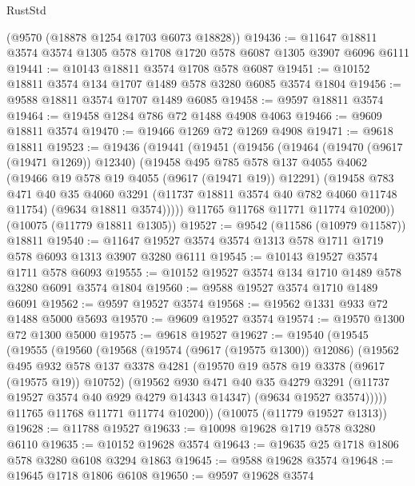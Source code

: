 \begin{lexlean}{RustStd}
\begin{coremodule}
    (@9570 (@18878 @1254 @1703 @6073 @18828))
@19436 := @11647 @18811 @3574 @3574 @1305 @578 @1708 @1720 @578 @6087 @1305 @3907 @6096 @6111
@19441 := @10143 @18811 @3574 @1708 @578 @6087
@19451 := @10152 @18811 @3574 @134 @1707 @1489 @578 @3280 @6085 @3574 @1804
@19456 := @9588 @18811 @3574 @1707 @1489 @6085
@19458 := @9597 @18811 @3574
@19464 := @19458 @1284 @786 @72 @1488 @4908 @4063
@19466 := @9609 @18811 @3574
@19470 := @19466 @1269 @72 @1269 @4908
@19471 := @9618 @18811
@19523 := @19436
    (@19441
      (@19451
        (@19456
          (@19464
            (@19470 (@9617 (@19471 @1269)) @12340)
            (@19458
              @495
              @785
              @578
              @137
              @4055
              @4062
              (@19466 @19 @578 @19 @4055 (@9617 (@19471 @19)) @12291)
              (@19458
                @783
                @471
                @40
                @35
                @4060
                @3291
                (@11737 @18811 @3574 @40 @782 @4060 @11748 @11754)
                (@9634 @18811 @3574)))))
        @11765
        @11768
        @11771
        @11774
        @10200))
    (@10075 (@11779 @18811 @1305))
@19527 := @9542 (@11586 (@10979 @11587)) @18811
@19540 := @11647 @19527 @3574 @3574 @1313 @578 @1711 @1719 @578 @6093 @1313 @3907 @3280 @6111
@19545 := @10143 @19527 @3574 @1711 @578 @6093
@19555 := @10152 @19527 @3574 @134 @1710 @1489 @578 @3280 @6091 @3574 @1804
@19560 := @9588 @19527 @3574 @1710 @1489 @6091
@19562 := @9597 @19527 @3574
@19568 := @19562 @1331 @933 @72 @1488 @5000 @5693
@19570 := @9609 @19527 @3574
@19574 := @19570 @1300 @72 @1300 @5000
@19575 := @9618 @19527
@19627 := @19540
    (@19545
      (@19555
        (@19560
          (@19568
            (@19574 (@9617 (@19575 @1300)) @12086)
            (@19562
              @495
              @932
              @578
              @137
              @3378
              @4281
              (@19570 @19 @578 @19 @3378 (@9617 (@19575 @19)) @10752)
              (@19562
                @930
                @471
                @40
                @35
                @4279
                @3291
                (@11737 @19527 @3574 @40 @929 @4279 @14343 @14347)
                (@9634 @19527 @3574)))))
        @11765
        @11768
        @11771
        @11774
        @10200))
    (@10075 (@11779 @19527 @1313))
@19628 := @11788 @19527
@19633 := @10098 @19628 @1719 @578 @3280 @6110
@19635 := @10152 @19628 @3574
@19643 := @19635 @25 @1718 @1806 @578 @3280 @6108 @3294 @1863
@19645 := @9588 @19628 @3574
@19648 := @19645 @1718 @1806 @6108
@19650 := @9597 @19628 @3574

\end{coremodule}
\end{lexlean}
